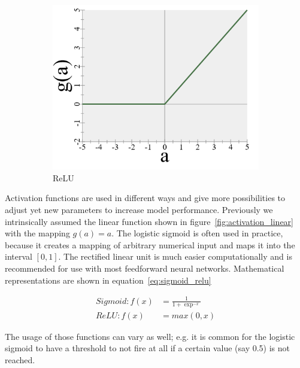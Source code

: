 \begin{figure}
\begin{subfigure}[b]{0.3\textwidth}
        \includegraphics[width=\textwidth]{images/4_relu.png}
        \caption{ReLU}
        \label{fig:activation_relu}
    \end{subfigure}
    \caption{} %
    \label{fig:activation}
\end{figure}

Activation functions are used in different ways and give more possibilities to adjust yet new parameters to increase model performance.
Previously we intrinsically assumed the linear function shown in figure~\ref{fig:activation_linear} with the mapping $g(a) = a$.
The logistic sigmoid is often used in practice, because it creates a mapping of arbitrary numerical input and maps it into the interval $[0,1]$.
The rectified linear unit is much easier computationally and is recommended for use with most feedforward neural networks\cite[p.169]{Goodfellow2017}\cite{Glorot2011}.
Mathematical representations are shown in equation~\eqref{eq:sigmoid_relu}

\begin{equation}
    \begin{split}
        Sigmoid: f(x) & = \frac{1}{1 + \exp^{-x}} \\ ReLU: f(x) & = max(0, x)
    \end{split}
    \label{eq:sigmoid_relu}
\end{equation}

The usage of those functions can vary as well; e.g. it is common for the logistic sigmoid to have a threshold to not fire at all if a certain value (say 0.5) is not reached.

